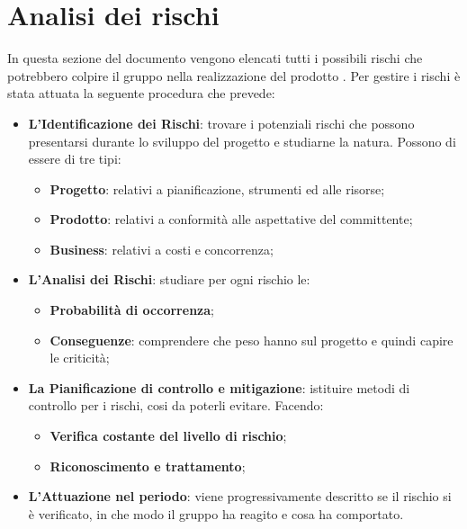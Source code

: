 \newpage
\section{Analisi dei rischi}

	In questa sezione del documento vengono elencati tutti i possibili rischi che potrebbero colpire il gruppo \gruppo nella realizzazione del prodotto \progetto. Per gestire i rischi è stata attuata la seguente procedura che prevede: 
	
	\begin{itemize}
		
		\item \textbf{L'Identificazione dei Rischi}: trovare i potenziali rischi che possono presentarsi durante lo sviluppo del progetto e studiarne la natura. Possono di essere di tre tipi:
			\begin{itemize}
				\item \textbf{Progetto}: relativi a pianificazione, strumenti ed alle risorse;
				\item \textbf{Prodotto}: relativi a conformità alle aspettative del committente;
				\item \textbf{Business}: relativi a costi e concorrenza;
			\end{itemize} 
				
		\item \textbf{L'Analisi dei Rischi}: studiare per ogni rischio le: 	
			\begin{itemize}
				\item \textbf{Probabilità di occorrenza};
				\item \textbf{Conseguenze}: comprendere che peso hanno sul progetto e quindi capire le criticità; 			
			\end{itemize}
		
		\item \textbf{La Pianificazione di controllo e mitigazione}: istituire metodi di controllo per i rischi, cosi da poterli evitare. Facendo:
			\begin{itemize}
				\item \textbf{Verifica costante del livello di rischio};
				\item \textbf{Riconoscimento e trattamento};
			\end{itemize}
			
		\item \textbf{L'Attuazione nel periodo}: viene progressivamente descritto se il rischio si è verificato, in che modo il gruppo ha reagito e cosa ha comportato. 
		
	\end{itemize}
	
